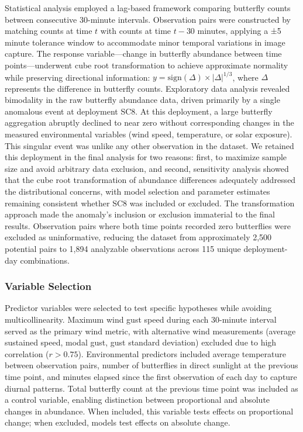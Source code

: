 Statistical analysis employed a lag-based framework comparing butterfly counts between consecutive 30-minute intervals. Observation pairs were constructed by matching counts at time $t$ with counts at time $t-30$ minutes, applying a ±5 minute tolerance window to accommodate minor temporal variations in image capture. The response variable—change in butterfly abundance between time points—underwent cube root transformation to achieve approximate normality while preserving directional information: $y = \text{sign}(\Delta) \times |\Delta|^{1/3}$, where $\Delta$ represents the difference in butterfly counts. Exploratory data analysis revealed bimodality in the raw butterfly abundance data, driven primarily by a single anomalous event at deployment SC8. At this deployment, a large butterfly aggregation abruptly declined to near zero without corresponding changes in the measured environmental variables (wind speed, temperature, or solar exposure). This singular event was unlike any other observation in the dataset. We retained this deployment in the final analysis for two reasons: first, to maximize sample size and avoid arbitrary data exclusion, and second, sensitivity analysis showed that the cube root transformation of abundance differences adequately addressed the distributional concerns, with model selection and parameter estimates remaining consistent whether SC8 was included or excluded. The transformation approach made the anomaly's inclusion or exclusion immaterial to the final results. Observation pairs where both time points recorded zero butterflies were excluded as uninformative, reducing the dataset from approximately 2,500 potential pairs to 1,894 analyzable observations across 115 unique deployment-day combinations.

\subsubsection{Variable Selection}

Predictor variables were selected to test specific hypotheses while avoiding multicollinearity. Maximum wind gust speed during each 30-minute interval served as the primary wind metric, with alternative wind measurements (average sustained speed, modal gust, gust standard deviation) excluded due to high correlation ($r > 0.75$). Environmental predictors included average temperature between observation pairs, number of butterflies in direct sunlight at the previous time point, and minutes elapsed since the first observation of each day to capture diurnal patterns. Total butterfly count at the previous time point was included as a control variable, enabling distinction between proportional and absolute changes in abundance. When included, this variable tests effects on proportional change; when excluded, models test effects on absolute change.

